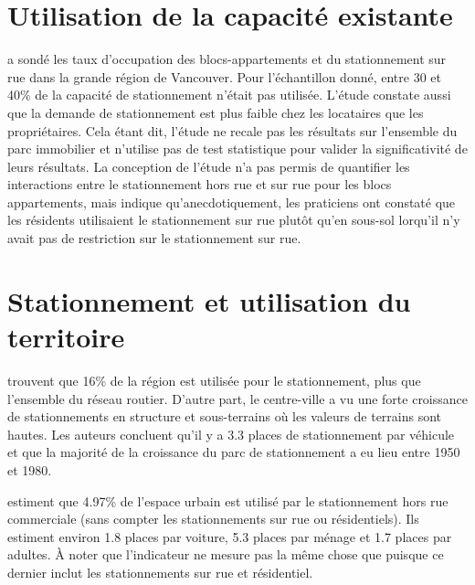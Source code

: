 \section{Utilisation de la capacité existante}
\textcite{Translink:2018Regional:2019} a sondé les taux d'occupation des blocs-appartements et du stationnement sur rue dans la grande région de Vancouver. Pour l'échantillon donné, entre 30 et 40\% de la capacité de stationnement n'était pas utilisée. L'étude constate aussi que la demande de stationnement est plus faible chez les locataires que les propriétaires. Cela étant dit, l'étude ne recale pas les résultats sur l'ensemble du parc immobilier et n'utilise pas de test statistique pour valider la significativité de leurs résultats. La conception de l'étude n'a pas permis de quantifier les interactions entre le stationnement hors rue et sur rue pour les blocs appartements, mais indique qu'anecdotiquement, les praticiens ont constaté que les résidents utilisaient le stationnement sur rue plutôt qu'en sous-sol lorqu'il n'y avait pas de restriction sur le stationnement sur rue. 

\section{Stationnement et utilisation du territoire}
\textcite{Chester:ParkingInfrastructure:2015} trouvent que 16\% de la région est utilisée pour le stationnement, plus que l'ensemble du réseau routier. D'autre part, le centre-ville a vu une forte croissance de stationnements en structure et sous-terrains où les valeurs de terrains sont hautes. Les auteurs concluent qu'il y a 3.3 places de stationnement par véhicule et que la majorité de la croissance du parc de stationnement a eu lieu entre 1950 et 1980.\par

\textcite{Davis:EstimatingParking:2010} estiment que 4.97\% de l'espace urbain est utilisé par le stationnement hors rue commerciale (sans compter les stationnements sur rue ou résidentiels). Ils estiment environ 1.8 places par voiture, 5.3 places par ménage et 1.7 places par adultes. À noter que l'indicateur ne mesure pas la même chose que \textcite{Chester:ParkingInfrastructure:2015} puisque ce dernier inclut les stationnements sur rue et résidentiel.

